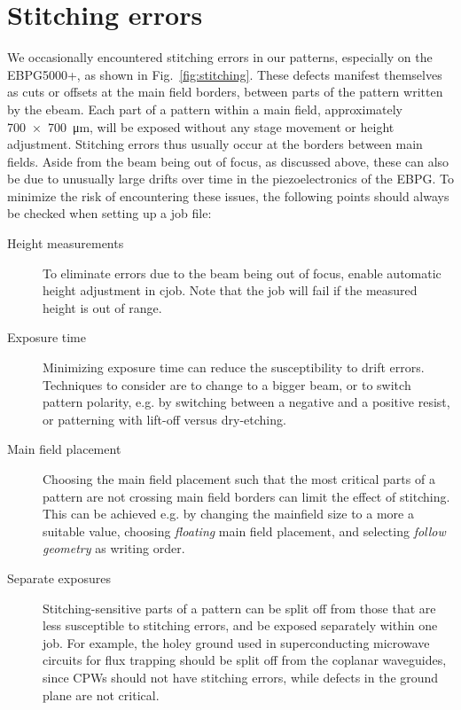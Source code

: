 \section{Stitching errors}

We occasionally encountered stitching errors in our patterns, especially on the EBPG5000+, as shown in Fig.~\ref{fig:stitching}.
%
These defects manifest themselves as cuts or offsets at the main field borders, between parts of the pattern written by the ebeam.
%
Each part of a pattern within a main field, approximately \SI{700x700}{\micro\meter}, will be exposed without any stage movement or height adjustment.
%
Stitching errors thus usually occur at the borders between main fields.
%
Aside from the beam being out of focus, as discussed above, these can also be due to unusually large drifts over time in the piezoelectronics of the EBPG.
%
To minimize the risk of encountering these issues, the following points should always be checked when setting up a job file:
%
\begin{description}
	\item[Height measurements]
	To eliminate errors due to the beam being out of focus, enable automatic height adjustment in cjob.
	Note that the job will fail if the measured height is out of range.
	\item[Exposure time]
	Minimizing exposure time can reduce the susceptibility to drift errors.
	Techniques to consider are to change to a bigger beam, or to switch pattern polarity, e.g. by switching between a negative and a positive resist, or patterning with lift-off versus dry-etching.
	\item[Main field placement]
	Choosing the main field placement such that the most critical parts of a pattern are not crossing main field borders can limit the effect of stitching.
	This can be achieved e.g. by changing the mainfield size to a more a suitable value, choosing \textit{floating} main field placement, and selecting \textit{follow geometry} as writing order.
	\item[Separate exposures]
	Stitching-sensitive parts of a pattern can be split off from those that are less susceptible to stitching errors, and be exposed separately within one job.
	For example, the holey ground used in superconducting microwave circuits for flux trapping should be split off from the coplanar waveguides, since CPWs should not have stitching errors, while defects in the ground plane are not critical.
\end{description}

